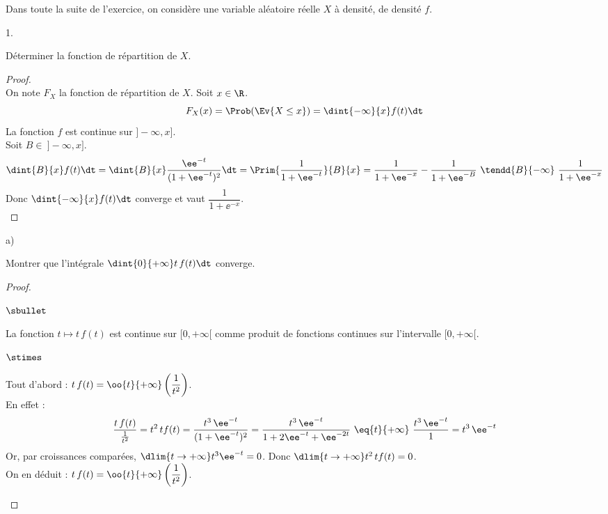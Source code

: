 \documentclass[11pt]{article}%
\begin{document}
\noindent
Dans toute la suite de l'exercice, on considère une variable aléatoire 
réelle $X$ à densité, de densité $f$.
\begin{noliste}{1.}
\setlength{\itemsep}{2mm}
\setcounter{enumi}{2}
\item Déterminer la fonction de répartition de $X$.

\begin{proof}~\\
 On note $F_X$ la fonction de répartition de $X$. Soit $x\in\R$.
 \[
  F_X(x) = \Prob(\Ev{X\leq x}) = \dint{-\infty}{x} f(t)\dt
 \]
 La fonction $f$ est continue sur $]-\infty, x]$.\\
 Soit $B \in \ ]-\infty, x]$.
 \[
  \dint{B}{x} f(t)\dt = \dint{B}{x} \dfrac{\ee^{-t}}{(1+\ee^{-t})^2}
  \dt = \Prim{\dfrac{1}{1+\ee^{-t}}}{B}{x} = 
  \dfrac{1}{1+\ee^{-x}} - \dfrac{1}{1+\ee^{-B}} \ \tendd{B}{-\infty} \
  \dfrac{1}{1+\ee^{-x}}
 \]
 Donc $\dint{-\infty}{x}f(t)\dt$ converge et vaut
 $\dfrac{1}{1+\ee^{-x}}$.
 ~\\[-1cm]
\end{proof}


\item
\begin{noliste}{a)}
\item Montrer que l'intégrale $\dint{0}{+\infty}t \, f(t)\dt$ 
converge.

\begin{proof}~
 \begin{noliste}{$\sbullet$}
 \item La fonction $t\mapsto t\, f(t)$ est continue sur $[0,+\infty[$
   comme produit de fonctions continues sur l'intervalle
   $[0,+\infty[$.
  
\item
  \begin{noliste}{$\stimes$}
  \item Tout d'abord : $t\, f(t) = \oo{t}{+\infty}
    \left(\dfrac{1}{t^2}\right)$.\\
    En effet : 
    \[
    \dfrac{t\, f(t)}{\frac{1}{t^2}} = t^2 \, tf(t) 
    = \dfrac{t^3 \, \ee^{-t}}{(1+\ee^{-t})^2} = 
    \dfrac{t^3\, \ee^{-t}}{1+2\ee^{-t}+\ee^{-2t}}
    \ \eq{t}{+\infty} \ \dfrac{t^3 \, \ee^{-t}}{1} = t^3\, \ee^{-t}
    \]
    Or, par croissances comparées, $\dlim{t\to+\infty} t^3\ee^{-t}=0$.
    Donc $\dlim{t\to+\infty} t^2 \, tf(t)=0$.\\[.2cm]
    On en déduit : $t\, f(t) = \oo{t}{+\infty}
    \left(\dfrac{1}{t^2}\right)$.


\end{noliste}
\end{noliste}
\end{proof}
\end{noliste}
\end{noliste}
\end{document}

